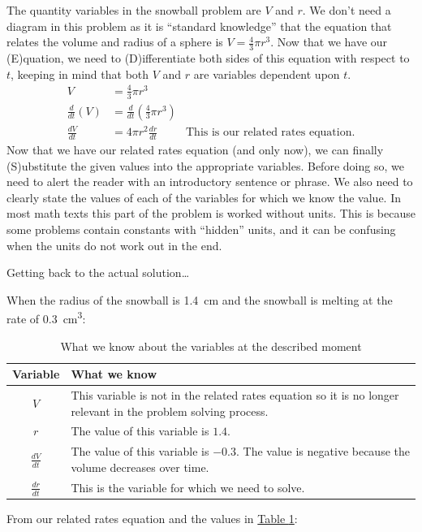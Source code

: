 \documentclass[10pt,oneside,]{book}
\newcommand{\acronym}[1]{#1}
\theoremstyle{plain}
\theoremstyle{definition}
\numberwithin{equation}{section}
\newcommand{\lz}[2]{\frac{d#1}{d#2}}
\newcommand{\lzoo}[2]{{\frac{d}{d#1}}{\left(#2\right)}}
\begin{document}
The quantity variables in the snowball problem are \(V\) and \(r\). We don't need a diagram in this problem as it is ``standard knowledge'' that the equation that relates the volume and radius of a sphere is \(V=\frac{4}{3}\pi r^3\). Now that we have our (\acronym{E})quation, we need to (\acronym{D})ifferentiate both sides of this equation with respect to \(t\), keeping in mind that both \(V\) and \(r\) are variables dependent upon \(t\).\begin{align*}
V&=\frac{4}{3}\pi r^3\\
\lzoo{t}{V}&=\lzoo{t}{\frac{4}{3}\pi r^3}\\
\lz{V}{t}&=4\pi r^2\lz{r}{t}&\text{This is our related rates equation.}
\end{align*}Now that we have our related rates equation (and only now), we can finally (\acronym{S})ubstitute the given values into the appropriate variables. Before doing so, we need to alert the reader with an introductory sentence or phrase. We also need to clearly state the values of each of the variables for which we know the value. In most math texts this part of the problem is worked without units. This is because some problems contain constants with ``hidden'' units, and it can be confusing when the units do not work out in the end.%
\par
Getting back to the actual solution\dots{}%
\par
When the radius of the snowball is \SI{1.4}{\centi\meter} and the snowball is melting at the rate of \SI{0.3}{\centi\meter\tothe{3}}:%
\begin{table}
\centering
\caption{What we know about the variables at the described moment\label{table-snowball-what-we-know}}
\begin{tabular}{cp{4in}}
\toprule
Variable&What we know\\
\midrule
\(V\)&This variable is not in the related rates equation so it is no longer relevant in the problem solving process.\\
\midrule
\(r\)&The value of this variable is \(1.4\).\\
\midrule
\(\lz{V}{t}\)&The value of this variable is \(-0.3\). The value is negative because the volume decreases over time.\\
\midrule
\(\lz{r}{t}\)&This is the variable for which we need to solve.\\
\bottomrule
\end{tabular}
\end{table}
\par
From our related rates equation and the values in \hyperref[table-snowball-what-we-know]{Table \ref{table-snowball-what-we-know}}:%
\end{document}
